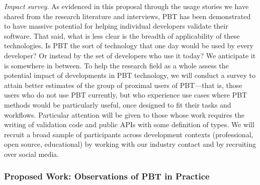 \emph{Impact survey}. As evidenced in this proposal through
the usage stories we have shared from the research
literature and interviews, PBT has been demonstrated to have
massive potential for helping individual developers validate
their software. That said, what is less clear is the breadth
of applicability of these technologies. Is PBT the sort of
technology that one day would be used by every developer? Or
instead by the set of developers who use it today? We
anticipate it is somewhere in between. To help the research
field as a whole assess the potential impact of developments
in PBT technology, we will conduct a survey to attain better
estimates of the group of proximal users of PBT---that is,
those users who do not use PBT currently, but who experience
use cases where PBT methods would be particularly useful,
once designed to fit their tasks and workflows. Particular
attention will be given to those whose work requires the
writing of validation code and public APIs with some
definition of types. We will recruit a broad sample of
participants across development contexts (professional, open
source, educational) by working with our industry contact
and by recruiting over social media. 




\subsubsection{Proposed Work: Observations of PBT in Practice}
\label{sec:observations}


